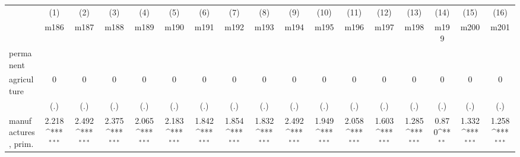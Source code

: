 {
\def\sym#1{\ifmmode^{#1}\else\(^{#1}\)\fi}
\begin{tabular}{l*{16}{c}}
\hline\hline
                    &\multicolumn{1}{c}{(1)}&\multicolumn{1}{c}{(2)}&\multicolumn{1}{c}{(3)}&\multicolumn{1}{c}{(4)}&\multicolumn{1}{c}{(5)}&\multicolumn{1}{c}{(6)}&\multicolumn{1}{c}{(7)}&\multicolumn{1}{c}{(8)}&\multicolumn{1}{c}{(9)}&\multicolumn{1}{c}{(10)}&\multicolumn{1}{c}{(11)}&\multicolumn{1}{c}{(12)}&\multicolumn{1}{c}{(13)}&\multicolumn{1}{c}{(14)}&\multicolumn{1}{c}{(15)}&\multicolumn{1}{c}{(16)}\\
                    &\multicolumn{1}{c}{m186}&\multicolumn{1}{c}{m187}&\multicolumn{1}{c}{m188}&\multicolumn{1}{c}{m189}&\multicolumn{1}{c}{m190}&\multicolumn{1}{c}{m191}&\multicolumn{1}{c}{m192}&\multicolumn{1}{c}{m193}&\multicolumn{1}{c}{m194}&\multicolumn{1}{c}{m195}&\multicolumn{1}{c}{m196}&\multicolumn{1}{c}{m197}&\multicolumn{1}{c}{m198}&\multicolumn{1}{c}{m199}&\multicolumn{1}{c}{m200}&\multicolumn{1}{c}{m201}\\
\hline
permanent           &                     &                     &                     &                     &                     &                     &                     &                     &                     &                     &                     &                     &                     &                     &                     &                     \\
agriculture         &           0         &           0         &           0         &           0         &           0         &           0         &           0         &           0         &           0         &           0         &           0         &           0         &           0         &           0         &           0         &           0         \\
                    &         (.)         &         (.)         &         (.)         &         (.)         &         (.)         &         (.)         &         (.)         &         (.)         &         (.)         &         (.)         &         (.)         &         (.)         &         (.)         &         (.)         &         (.)         &         (.)         \\
[1em]
manufactures, prim. &       2.218\sym{***}&       2.492\sym{***}&       2.375\sym{***}&       2.065\sym{***}&       2.183\sym{***}&       1.842\sym{***}&       1.854\sym{***}&       1.832\sym{***}&       2.492\sym{***}&       1.949\sym{***}&       2.058\sym{***}&       1.603\sym{***}&       1.285\sym{***}&       0.870\sym{**} &       1.332\sym{***}&       1.258\sym{***}\\

\end{tabular}}
